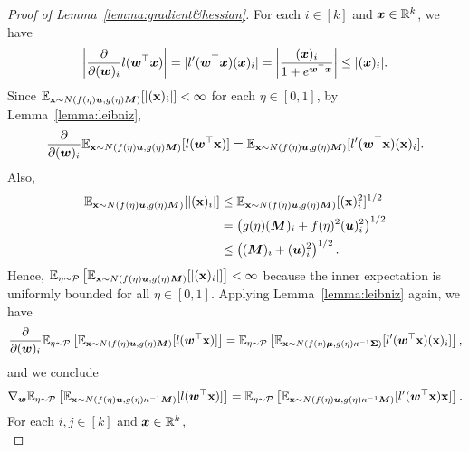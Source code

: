 \begin{proof}[Proof of Lemma~\ref{lemma:gradient&hessian}]
    For each $i \in [k]$ and ${\bm{x}} \in \mathbb{R}^k$, we have
    \begin{equation*}
        \left| \frac{\partial}{\partial ({\bm{w}})_i} l({\bm{w}}^\top {\bm{x}}) \right| = |l'({\bm{w}}^\top {\bm{x}}) ({\bm{x}})_i| = \left | \frac{({\bm{x}})_i}{1+e^{{\bm{w}}^\top {\bm{x}}}} \right| \leq |({\bm{x}})_i|.
    \end{equation*}
    Since $\mathbb{E}_{{\mathbf{x}} \sim N(f(\eta){\bm{u}}, g(\eta){\bm{M}})}[|({\mathbf{x}})_i|]<\infty$ for each $\eta \in [0,1]$, by Lemma~\ref{lemma:leibniz},
    \begin{equation*}
        \frac{\partial}{\partial ({\bm{w}})_i} \mathbb{E}_{{\mathbf{x}} \sim N(f(\eta){\bm{u}}, g(\eta){\bm{M}})}[l({\bm{w}}^\top {\mathbf{x}})] 
        = \mathbb{E}_{{\mathbf{x}} \sim N(f(\eta){\bm{u}}, g(\eta){\bm{M}})}[l'({\bm{w}}^\top {\mathbf{x}})({\mathbf{x}})_i].
    \end{equation*}
    Also, 
    \begin{align*}
        \mathbb{E}_{{\mathbf{x}} \sim N(f(\eta){\bm{u}}, g(\eta){\bm{M}})}[|({\mathbf{x}})_i|] &\leq \mathbb{E}_{{\mathbf{x}} \sim N(f(\eta){\bm{u}}, g(\eta){\bm{M}})}[({\mathbf{x}})_i^2]^{1/2} \\
        &= \left(g(\eta) ({\bm{M}})_i + f(\eta)^2 ({\bm{u}})_i^2 \right)^{1/2}\\
        &\leq \left(({\bm{M}})_i + ({\bm{u}})_i^2 \right)^{1/2}.
    \end{align*}
    Hence, $\mathbb{E}_{\eta \sim \mathcal{P}}\left[\mathbb{E}_{{\mathbf{x}} \sim N(f(\eta){\bm{u}}, g(\eta){\bm{M}})}[|({\mathbf{x}})_i|] \right]< \infty$ because the inner expectation is uniformly bounded for all $\eta \in [0,1]$. Applying Lemma~\ref{lemma:leibniz} again, we have
    \begin{equation*}
        \frac{\partial}{\partial ({\bm{w}})_i}\mathbb{E}_{\eta \sim \mathcal{P}}\left [\mathbb{E}_{{\mathbf{x}} \sim N(f(\eta){\bm{u}}, g(\eta) {\bm{M}})}[l({\bm{w}}^\top {\mathbf{x}})]\right ] 
        = \mathbb{E}_{\eta \sim \mathcal{P}}\left [\mathbb{E}_{{\mathbf{x}} \sim N(f(\eta){\bm{\mu}}, g(\eta) \kappa^{-1} {\bm{\Sigma}})}[l'({\bm{w}}^\top {\mathbf{x}})({\mathbf{x}})_i] \right ],
    \end{equation*}
    and we conclude
    \begin{equation*}
        \nabla_{\bm{w}} \mathbb{E}_{\eta \sim \mathcal{P}} \left [\mathbb{E}_{{\mathbf{x}} \sim N(f(\eta){\bm{u}}, g(\eta)\kappa^{-1}{\bm{M}})}[l({\bm{w}}^\top {\mathbf{x}})] \right ]
        = \mathbb{E}_{\eta \sim \mathcal{P}} \left [\mathbb{E}_{{\mathbf{x}} \sim N(f(\eta){\bm{u}}, g(\eta)\kappa^{-1}{\bm{M}})}[l'({\bm{w}}^\top {\mathbf{x}}){\mathbf{x}}] \right ].
    \end{equation*}
    For each $i,j \in [k]$ and ${\bm{x}} \in \mathbb{R}^k$,
    \begin{equation*}

\end{equation*}
\end{proof}
